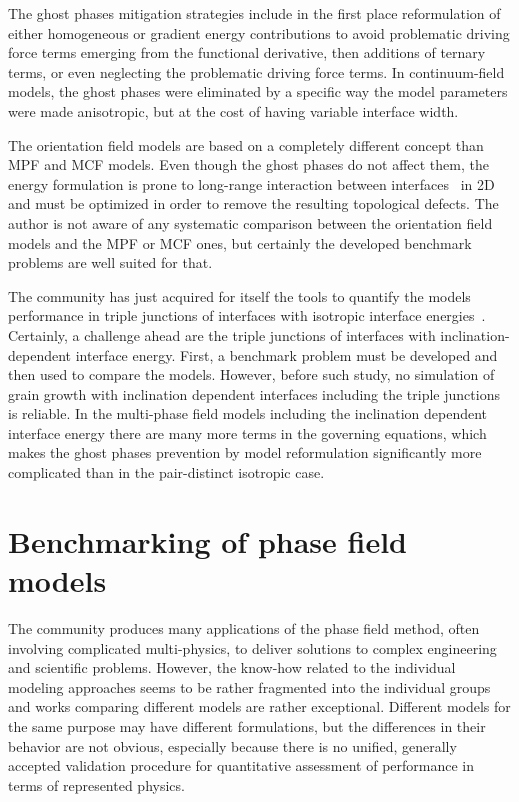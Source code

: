 	The ghost phases mitigation strategies include in the first place reformulation of either homogeneous or gradient energy contributions to avoid problematic driving force terms emerging from the functional derivative, then additions of ternary terms, or even neglecting the problematic driving force terms. In continuum-field models, the ghost phases were eliminated by a specific way the model parameters were made anisotropic, but at the cost of having variable interface width. 
	
	The orientation field models are based on a completely different concept than MPF and MCF models. Even though the ghost phases do not affect them, the energy formulation is prone to long-range interaction between interfaces~\cite{Korbuly2017} in 2D and must be optimized in order to remove the resulting topological defects. The author is not aware of any systematic comparison between the orientation field models and the MPF or MCF ones, but certainly the developed benchmark problems are well suited for that.
	
	The community has just acquired for itself the tools to quantify the models performance in triple junctions of interfaces with isotropic interface energies~\cite{Daubner2023}. Certainly, a challenge ahead are the triple junctions of interfaces with inclination-dependent interface energy.	First, a benchmark problem must be developed and then used to compare the models. However, before such study, no simulation of grain growth with inclination dependent interfaces including the triple junctions is reliable. In the multi-phase field models including the inclination dependent interface energy there are many more terms in the governing equations, which makes the ghost phases prevention by model reformulation significantly more complicated than in the pair-distinct isotropic case. 

\section{Benchmarking of phase field models}
The community produces many applications of the phase field method, often involving complicated multi-physics, to deliver solutions to complex engineering and scientific problems. However, the know-how related to the individual modeling approaches seems to be rather fragmented into the individual groups and works comparing different models are rather exceptional. Different models for the same purpose may have different formulations, but the differences in their behavior are not obvious, especially because there is no unified, generally accepted validation procedure for quantitative assessment of performance in terms of represented physics. 

